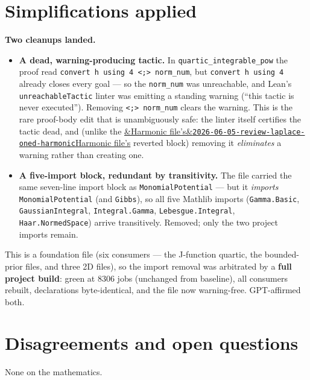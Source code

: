 \documentclass[11pt]{article}
\newcommand{\reviewref}[2][]{\href{https://therisensea.org/reviews/#2/}{\ifx&#1&\texttt{#2}\else#1\fi}}
\begin{document}
\section{Simplifications applied}
\textbf{Two cleanups landed.}
\begin{itemize}[noitemsep]
  \item \textbf{A dead, warning-producing tactic.} In \texttt{quartic\_integrable\_pow} the proof read
    \texttt{convert h using 4 <;> norm\_num}, but \texttt{convert h using 4} already closes every goal --- so
    the \texttt{norm\_num} was unreachable, and Lean's \texttt{unreachableTactic} linter was emitting a
    standing warning (``this tactic is never executed''). Removing \texttt{<;> norm\_num} clears the warning.
    This is the rare proof-body edit that is unambiguously safe: the linter itself certifies the tactic dead,
    and (unlike the \reviewref[Harmonic file's]{2026-06-05-review-laplace-oned-harmonic} reverted block)
    removing it \emph{eliminates} a warning rather than creating one.
  \item \textbf{A five-import block, redundant by transitivity.} The file carried the same seven-line import
    block as \texttt{MonomialPotential} --- but it \emph{imports} \texttt{MonomialPotential} (and
    \texttt{Gibbs}), so all five Mathlib imports (\texttt{Gamma.Basic}, \texttt{GaussianIntegral},
    \texttt{Integral.Gamma}, \texttt{Lebesgue.Integral}, \texttt{Haar.NormedSpace}) arrive transitively.
    Removed; only the two project imports remain.
\end{itemize}
This is a foundation file (six consumers --- the J-function quartic, the bounded-prior files, and three 2D
files), so the import removal was arbitrated by a \textbf{full project build}: green at $8306$ jobs (unchanged
from baseline), all consumers rebuilt, declarations byte-identical, and the file now warning-free.
GPT-affirmed both.

\section{Disagreements and open questions}
None on the mathematics.
\end{document}
